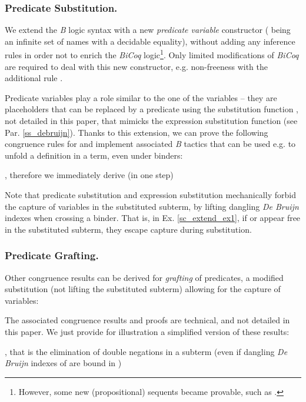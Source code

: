 \documentclass{llncs}
\begin{document}
\subsubsection{Predicate Substitution.} We extend the \emph{B} logic syntax with a new 
\emph{predicate variable} constructor  ( being an infinite 
set of names with a decidable equality), without adding any inference rules in order not to 
enrich the \emph{BiCoq} logic\footnote{However, some new (propositional) sequents became 
provable, such as .}. Only limited modifications of \emph{BiCoq} 
are required to deal with this new constructor, e.g. non-freeness with the additional rule
.

Predicate variables play a role similar to the one of the variables -- they are placeholders 
that can be replaced by a predicate using the substitution function
, not detailed in this 
paper, that mimicks the expression substitution function (see Par. \ref{ss_debruijn}). Thanks 
to this extension, we can prove the following congruence rules for  and implement 
associated \emph{B} tactics that can be used e.g. to unfold a definition in a term, even under 
binders:


\begin{example}\label{sc_extend_ex1}\small
, therefore we immediately derive (in one 
step)

\end{example}
Note that predicate substitution and expression substitution mechanically forbid the capture 
of variables in the substituted subterm, by lifting dangling \emph{De Bruijn} indexes when 
crossing a binder. That is, in Ex. \ref{sc_extend_ex1}, if  or  appear free in the 
substituted subterm, they escape capture during substitution.

\subsubsection{Predicate Grafting.} Other congruence results can be derived for 
\emph{grafting} of predicates, a modified substitution (not lifting the substituted subterm) 
allowing for the capture of variables:

The associated congruence results and proofs are technical, and not detailed in this paper. We 
just provide for illustration a simplified version of these results:


\begin{example}\label{sc_extend_ex2}\small
, 
that is the elimination of double negations in a subterm (even if dangling \emph{De Bruijn} 
indexes of  are bound in )
\end{example}
\end{document}
